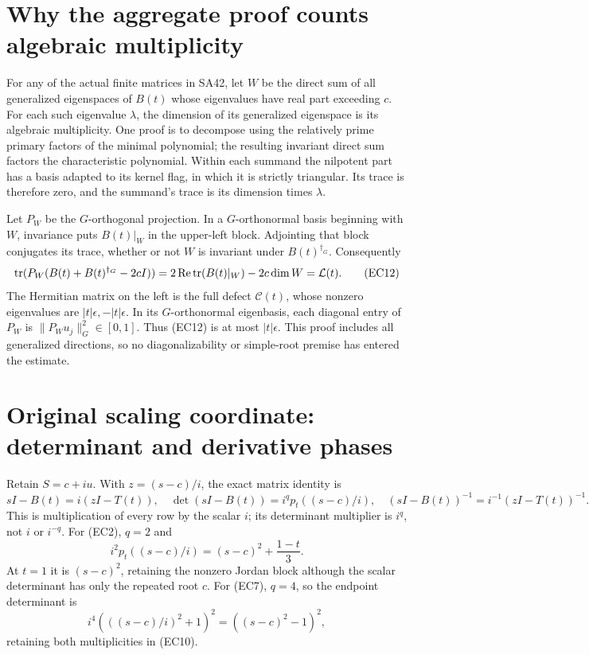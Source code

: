 \documentclass[11pt]{article}
\begin{document}
\section{Why the aggregate proof counts algebraic multiplicity}

For any of the actual finite matrices in SA42, let \(W\)
be the direct sum of all generalized eigenspaces of \(B(t)\)
whose eigenvalues have real part exceeding \(c\).
For each such eigenvalue \(\lambda\), the dimension of its
generalized eigenspace is its algebraic multiplicity.
One proof is to decompose using the relatively prime
primary factors of the minimal polynomial; the resulting
invariant direct sum factors the characteristic polynomial.
Within each summand the nilpotent part has a basis adapted
to its kernel flag, in which it is strictly triangular.
Its trace is therefore zero, and the summand's trace is
its dimension times \(\lambda\).

Let \(P_W\) be the \(G\)-orthogonal projection. In a
\(G\)-orthonormal basis beginning with \(W\), invariance
puts \(B(t)|_W\) in the upper-left block. Adjointing that
block conjugates its trace, whether or not \(W\) is
invariant under \(B(t)^{\dagger_G}\).
Consequently
\begin{equation}
 \operatorname{tr}(P_W(B(t)+B(t)^{\dagger_G}-2cI))
 =2\operatorname{Re}\operatorname{tr}(B(t)|_W)-2c\dim W
 =\mathcal L(t).
 \tag{EC12}
\end{equation}
The Hermitian matrix on the left is the full defect
\(\mathcal C(t)\), whose nonzero eigenvalues are
\(|t|\epsilon,-|t|\epsilon\). In its \(G\)-orthonormal
eigenbasis, each diagonal entry of \(P_W\) is
\(\|P_Wu_j\|_G^2\in[0,1]\). Thus (EC12) is at most
\(|t|\epsilon\). This proof includes all generalized
directions, so no diagonalizability or simple-root premise
has entered the estimate.

\section{Original scaling coordinate: determinant and derivative phases}

Retain \(S=c+iu\). With \(z=(s-c)/i\), the exact matrix identity is
\begin{equation}
 sI-B(t)=i(zI-T(t)),\quad
 \det(sI-B(t))=i^q p_t((s-c)/i),\quad
 (sI-B(t))^{-1}=i^{-1}(zI-T(t))^{-1}.
 \tag{EC13}
\end{equation}
This is multiplication of every row by the scalar \(i\);
its determinant multiplier is \(i^q\), not \(i\) or \(i^{-q}\).
For (EC2), \(q=2\) and
\[
 i^2p_t((s-c)/i)=(s-c)^2+\frac{1-t}{3}.
\]
At \(t=1\) it is \((s-c)^2\), retaining the nonzero
Jordan block although the scalar determinant has only the
repeated root \(c\). For (EC7), \(q=4\), so the endpoint
determinant is
\[
 i^4(( (s-c)/i)^2+1)^2
       =((s-c)^2-1)^2,
\]
retaining both multiplicities in (EC10).
\end{document}
